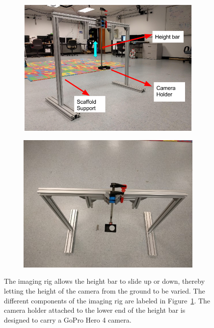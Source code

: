 \documentclass {udthesis}
\begin{document}
\begin{figure}
  \centering
  \begin{subfigure}[]{0.45\textwidth}
      \includegraphics[width=\textwidth]{imaging_rig_labeled}
      \caption{}
      \label{fig:im_rig_side}
  \end{subfigure}
  \begin{subfigure}[]{0.45\textwidth}
      \includegraphics[width=\textwidth]{imaging_rig_top_scaled}
      \caption{}
      \label{fig:im_rig_top}
  \end{subfigure}
\caption[Imaging rig used for data collection in multi-image object recognition approach]{The imaging rig allows the height bar to slide up or down, thereby letting the height of the camera from the ground to be varied. The different components of the imaging rig are labeled in Figure~\ref{fig:im_rig_side}. The camera holder attached to the lower end of the height bar is designed to carry a GoPro Hero 4 camera.}
\label{fig:im_rig}
\end{figure}	
\end{document}
